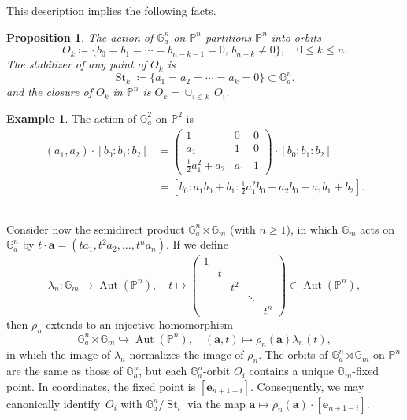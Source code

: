 \documentclass[11pt]{article}
\newtheorem{prop}[theo]{Proposition}
\theoremstyle{definition}
\newtheorem{exam}[theo]{Example}
\numberwithin{equation}{section}
\DeclareMathOperator{\Aut}{Aut}
\renewcommand{\P}{\mathbb{P}}
\newcommand{\Ga}{\mathbb{G}_a}
\newcommand{\Gm}{\mathbb{G}_m}
\newcommand{\G}{\mathbb{G}}
\DeclareMathOperator{\St}{St}
\newcommand{\revision}[1]{{#1}}
\begin{document}
This description implies the following facts.
\begin{prop}
  The action of $\Ga^n$ on $\P^n$ partitions $\P^n$ into orbits
  \[ O_k \coloneqq \{ b_0 = b_1 = \cdots = b_{n-k-1} = 0, \, b_{n-k} \neq 0 \}, \quad 0 \leq k \leq n. \]
  The stabilizer of any point of $O_k$ is
  \[ \St_k \coloneqq \{ a_1 = a_2 = \cdots = a_{k} = 0 \} \subset \Ga^n, \]
  and the closure of $O_k$ in $\P^n$ is $\overline{O_k} = \cup_{i \leq k} \,O_i$.
\end{prop}
\begin{exam}
  The action of $\G_a^2$ on $\P^2$ is 
  \begin{align*}
  (a_1, a_2) \cdot [b_0 : b_1 : b_2] &=
    \begin{pmatrix}
      1 & 0 & 0 \\
      a_1 & 1 & 0 \\
      \frac12 a_1^2 + a_2 & a_1 & 1
    \end{pmatrix}
    \cdot [b_0 : b_1 : b_2]\\
    &= \left[b_0 : a_1 b_0 + b_1 : \tfrac12 a_1^2 b_0 + a_2 b_0 + a_1 b_1 + b_2 \right].
   \end{align*}
\end{exam}

\subsection{}\label{rmk_Gm} Consider now the semidirect product  $\Ga^n \rtimes \Gm$ \revision{(with $n \geq 1$)}, in which $\Gm$ acts on $\Ga^n$ by $t \cdot \mathbf a = (t a_1, t^2 a_2, \ldots, t^n a_n)$.
    If we define
\[
 \lambda_n: \Gm \to \Aut(\P^n), \quad  t \mapsto \begin{pmatrix}
                                                1 &   & &&\\
                                                  & t &  &&\\
                                                  & & t^2 && \\
                                                  &&&\ddots & \\
                                                &&&& t^n
                                               \end{pmatrix} \in \Aut(\P^n),
\]
then $\rho_n$ extends to an injective homomorphism
\[ \Ga^n \rtimes \Gm \hookrightarrow \Aut(\P^n), \quad (\mathbf a,t) \mapsto \rho_n(\mathbf a) \lambda_n(t), \]
in which the image of $\lambda_n$ normalizes the image of $\rho_n$.
The orbits of $\Ga^n \rtimes \Gm$ on $\P^n$ are the same as those of $\Ga^n$, but each $\Ga^n$-orbit $O_i$ contains a unique $\Gm$-fixed point. In coordinates, the fixed point is $[\mathbf e_{n+1-i}]$. Consequently, we may canonically identify~$O_i$ with $\Ga^n / \St_i$ via the map $\mathbf a \mapsto \rho_n(\mathbf a) \cdot [\mathbf e_{n+1-i}]$.
\end{document}
